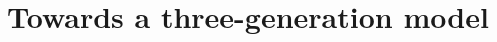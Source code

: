 \documentclass[letterpaper,12pt,titlepage,oneside,final]{book}
\begin{document}



























































\chapter{Towards a three-generation model\label{GEN}}
\end{document}
